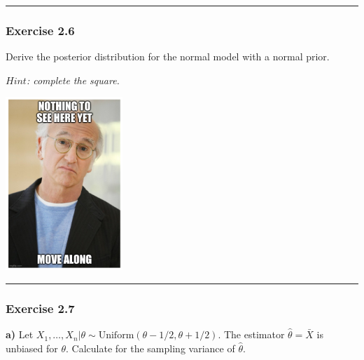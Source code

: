 \documentclass[
  letterpaper,
  DIV=11,
  numbers=noendperiod]{scrartcl}
\begin{document}
\begin{tcolorbox}
\end{tcolorbox}

\begin{center}\rule{0.5\linewidth}{0.5pt}\end{center}

\subsubsection{Exercise 2.6}\label{exercise-2.6}

Derive the posterior distribution for the normal model with a normal
prior.

\emph{$\textit{Hint}$: complete the square.}

\begin{tcolorbox}[enhanced jigsaw, coltitle=black, breakable, colbacktitle=quarto-callout-note-color!10!white, colframe=quarto-callout-note-color-frame, bottomrule=.15mm, toprule=.15mm, rightrule=.15mm, arc=.35mm, colback=white, opacityback=0, bottomtitle=1mm, leftrule=.75mm, title={Solution}, titlerule=0mm, toptitle=1mm, left=2mm, opacitybacktitle=0.6]

\includegraphics[width=1.73958in,height=\textheight,keepaspectratio]{../exercises/larry.png}

\end{tcolorbox}

\begin{center}\rule{0.5\linewidth}{0.5pt}\end{center}

\subsubsection{Exercise 2.7}\label{exercise-2.7}

\textbf{a)} Let
\(X_1,\dots,X_n |\theta \sim \mathrm{Uniform}(\theta-1/2,\theta+1/2)\).
The estimator \(\hat\theta= \bar X\) is unbiased for \(\theta\).
Calculate for the sampling variance of \(\hat\theta\).
\end{document}
